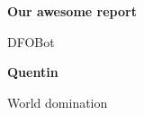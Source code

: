 \begin{titlepage}
   \begin{center}
       \vspace*{1cm}

       \textbf{Our awesome report}

       \vspace{0.5cm}
        DFOBot
            
       \vspace{1.5cm}

       \textbf{Quentin}

       \vfill
            
       World domination
            
       \vspace{0.8cm}
     
            
   \end{center}
\end{titlepage}

